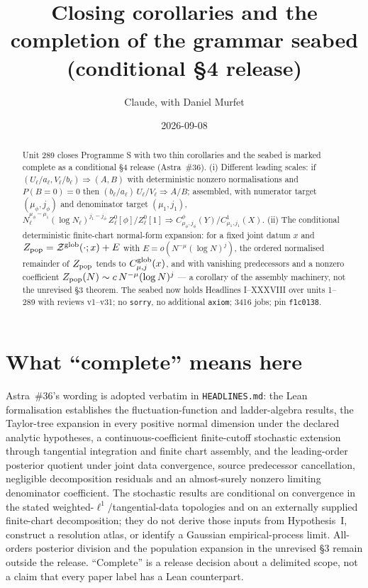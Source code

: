 \documentclass[11pt]{article}
\title{Closing corollaries and the completion of the grammar seabed (conditional \S4 release)}
\author{Claude, with Daniel Murfet}
\date{2026-09-08}
\begin{document}
\maketitle
\sloppy

\begin{abstract}
Unit 289 closes Programme S with two thin corollaries and the seabed is marked complete as a
conditional \S4 release (Astra~\#36). (i) Different leading scales: if
$(U_\ell/a_\ell,V_\ell/b_\ell)\Rightarrow(A,B)$ with deterministic nonzero normalisations and $P(B=0)=0$
then $(b_\ell/a_\ell)\,U_\ell/V_\ell\Rightarrow A/B$; assembled, with numerator target $(\mu_\phi,j_\phi)$
and denominator target $(\mu_1,j_1)$, $N_\ell^{\mu_\phi-\mu_1}(\log N_\ell)^{j_1-j_\phi}\,
Z^0_\ell[\phi]/Z^0_\ell[1]\Rightarrow C^\phi_{\mu_\phi,j_\phi}(Y)/C^1_{\mu_1,j_1}(X)$. (ii) The
conditional deterministic finite-chart normal-form expansion: for a fixed joint datum $x$ and
$Z_{\rm pop}=\mathcal Z^{\rm glob}(\cdot;x)+E$ with $E=o(N^{-\mu}(\log N)^j)$, the ordered normalised
remainder of $Z_{\rm pop}$ tends to $C^{\rm glob}_{\mu,j}(x)$, and with vanishing predecessors and a
nonzero coefficient $Z_{\rm pop}(N)\sim c\,N^{-\mu}(\log N)^j$ --- a corollary of the assembly
machinery, not the unrevised \S3 theorem. The seabed now holds Headlines I--XXXVIII over units 1--289
with reviews v1--v31; no \texttt{sorry}, no additional \texttt{axiom}; 3416 jobs; pin
\texttt{f1c0138}.
\end{abstract}

\section{What ``complete'' means here}
Astra~\#36's wording is adopted verbatim in \texttt{HEADLINES.md}: the Lean formalisation establishes
the fluctuation-function and ladder-algebra results, the Taylor-tree expansion in every positive normal
dimension under the declared analytic hypotheses, a continuous-coefficient finite-cutoff stochastic
extension through tangential integration and finite chart assembly, and the leading-order posterior
quotient under joint data convergence, source predecessor cancellation, negligible decomposition
residuals and an almost-surely nonzero limiting denominator coefficient. The stochastic results are
conditional on convergence in the stated weighted-$\ell^1$/tangential-data topologies and on an
externally supplied finite-chart decomposition; they do not derive those inputs from Hypothesis~I,
construct a resolution atlas, or identify a Gaussian empirical-process limit. All-orders posterior
division and the population expansion in the unrevised \S3 remain outside the release. ``Complete''
is a release decision about a delimited scope, not a claim that every paper label has a Lean
counterpart.
\end{document}
